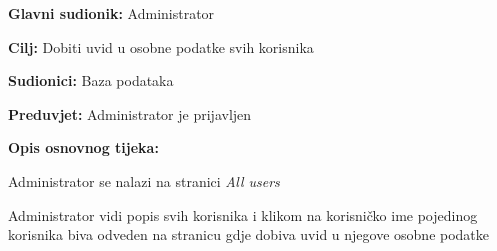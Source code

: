 					\noindent {}
					\begin{packed_item}
	
						\item \textbf{Glavni sudionik: }Administrator
						\item  \textbf{Cilj:} Dobiti uvid u osobne podatke svih korisnika
						\item  \textbf{Sudionici:} Baza podataka
						\item  \textbf{Preduvjet:} Administrator je prijavljen
						\item  \textbf{Opis osnovnog tijeka:}
						
						\item[] \begin{packed_enum}
	
							\item Administrator se nalazi na stranici \textit{All users}
							\item Administrator vidi popis svih korisnika i klikom na korisničko ime pojedinog korisnika biva odveden na stranicu gdje dobiva uvid u njegove osobne podatke
							
						\end{packed_enum}
						
					\end{packed_item}
					
